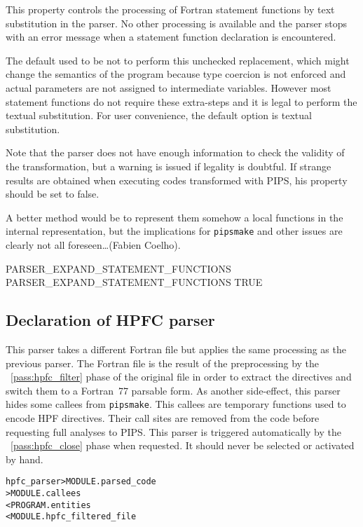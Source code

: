 \documentclass[a4paper]{report}
\newenvironment{PipsMake}{\begin{alltt}}{\end{alltt}}
\newcommand{\PipsPassRef}[1]{\texttt{\detokenize{#1}}~\ref{pass:#1}}
\newenvironment{PipsPass}[1]{\label{pass:#1}}{}
\newcommand{\Pipsmake}{\texttt{pipsmake}}
\begin{document}
This property controls the processing of Fortran statement functions by text
substitution in the parser. No other processing is available and the
parser stops with an error message when a statement function declaration
is encountered.

The default used to be not to perform this unchecked replacement, which might
change the semantics of the program because type coercion is not enforced
and actual parameters are not assigned to intermediate variables.
However most statement functions do not require these extra-steps and it
is legal to perform the textual substitution. For user convenience, the
default option is textual substitution.

Note that the parser does not have enough information to check the validity
of the transformation, but a warning is issued if legality is doubtful. If
strange results are obtained when executing codes transformed with PIPS,
his property should be set to false.

A better method would be to represent them somehow a local functions in
the internal representation, but the implications for \Pipsmake{}
and other issues are clearly not all foreseen\ldots (Fabien Coelho).

\begin{PipsProp}{PARSER_EXPAND_STATEMENT_FUNCTIONS}
PARSER_EXPAND_STATEMENT_FUNCTIONS TRUE
\end{PipsProp}


\subsection{Declaration of HPFC parser}

\begin{PipsPass}{hpfc_parser}
This parser takes a different Fortran file but applies the same
processing as the previous parser. The Fortran file is the result of the
preprocessing by the \PipsPassRef{hpfc_filter} phase of the original file in
order to extract the directives and switch them to a Fortran~77 parsable
form. As another side-effect, this parser hides some callees from
\Pipsmake{}. This callees are temporary functions used to encode HPF
directives. Their call sites are removed from the code before requesting full analyses
to PIPS. This parser is triggered automatically by the \PipsPassRef{hpfc_close}
phase when requested. It should never be selected or activated by hand.
\end{PipsPass}

\begin{PipsMake}
hpfc_parser                     > MODULE.parsed_code
                                > MODULE.callees
        < PROGRAM.entities
        < MODULE.hpfc_filtered_file
\end{PipsMake}
\end{document}

